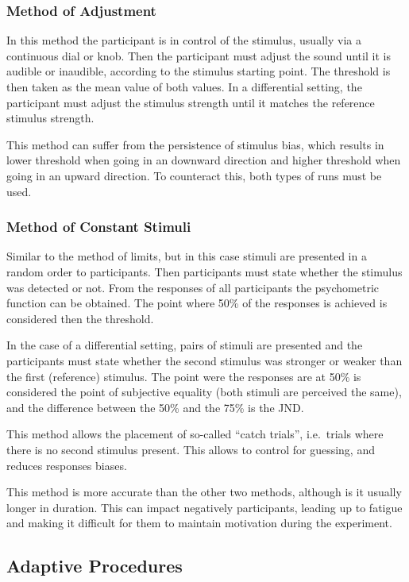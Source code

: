 \documentclass[../main.tex]{subfiles}
\begin{document}
\begin{theoreticalbackground}
\subsubsection{Method of Adjustment}

In this method the participant is in control of the stimulus, usually via a
continuous dial or knob. Then the participant must adjust the sound until it is
audible or inaudible, according to the stimulus starting point. The threshold is
then taken as the mean value of both values. In a differential setting, the
participant must adjust the stimulus strength until it matches the reference
stimulus strength.

This method can suffer from the persistence of stimulus bias, which results in
lower threshold when going in an downward direction and higher threshold when
going in an upward direction. To counteract this, both types of runs must be
used.

\subsubsection{Method of Constant Stimuli}

Similar to the method of limits, but in this case stimuli are presented in a
random order to participants. Then participants must state whether the stimulus
was detected or not. From the responses of all participants the psychometric
function can be obtained. The point where 50\% of the responses is achieved is
considered then the threshold.

In the case of a differential setting, pairs of stimuli are presented and the
participants must state whether the second stimulus was stronger or weaker than
the first (reference) stimulus. The point were the responses are at 50\% is
considered the point of subjective equality (both stimuli are perceived the
same), and the difference between the 50\% and the 75\% is the JND.

This method allows the placement of so-called ``catch trials'', i.e.\ trials
where there is no second stimulus present. This allows to control for guessing,
and reduces responses biases.

This method is more accurate than the other two methods, although is it usually
longer in duration. This can impact negatively participants, leading up to
fatigue and making it difficult for them to maintain motivation during the
experiment.

\subsection{Adaptive Procedures}


\end{theoreticalbackground}
\end{document}
